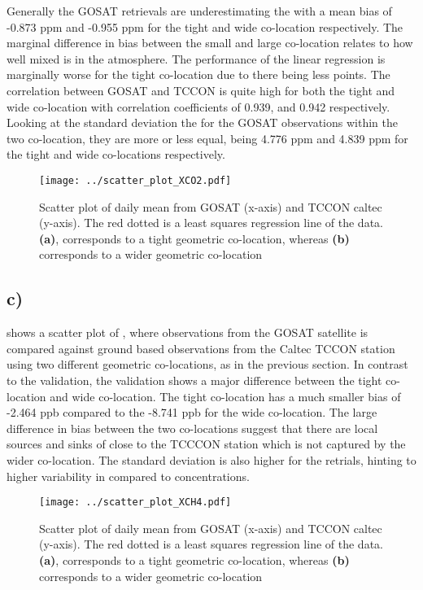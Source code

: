 Generally the GOSAT retrievals
are underestimating the  with a mean bias of -0.873 ppm and -0.955 ppm for the
tight and wide co-location respectively. The marginal difference in bias between
the small and large co-location relates to how well mixed  is in the
atmosphere. The performance of the linear
regression is marginally worse for the tight co-location due to there being less
points. The correlation between GOSAT and TCCON is quite high for both the tight
and wide co-location with correlation coefficients of 0.939, and 0.942
respectively. Looking at the
standard deviation the for the GOSAT observations within the two  co-location, they
are more or less equal, being 4.776 ppm and 4.839 ppm for the tight and wide
co-locations respectively. 
\begin{figure}[htbp]
    \centering
    \texttt{[image: ../scatter\_plot\_XCO2.pdf]}
    \caption{Scatter plot of daily mean  from GOSAT (x-axis) and TCCON caltec (y-axis). The red dotted is a least squares regression line of the data. \textbf{(a)}, corresponds to a tight geometric co-location, whereas \textbf{(b)} corresponds to a wider geometric co-location}
    \label{fig:scatter_XCO2}
\end{figure}

\subsection*{c)} 
 shows a scatter plot of , where observations
from the GOSAT satellite is compared against ground based observations from
the Caltec TCCON station using two different geometric co-locations, as in the
previous section. In contrast to the  validation, the 
validation shows a major difference between the tight co-location and wide
co-location. The tight 
co-location has a much smaller bias of -2.464 ppb compared to the -8.741 ppb for
the wide co-location. The large difference in bias between the two co-locations
suggest that there are local sources and sinks of  close to the TCCCON
station which is not captured by the wider co-location. The standard deviation
is also higher for the  retrials, hinting to higher variability in
 compared to  concentrations. 
\begin{figure}
    \centering
    \texttt{[image: ../scatter\_plot\_XCH4.pdf]}
    \caption{Scatter plot of daily mean  from GOSAT (x-axis) and TCCON caltec (y-axis). The red dotted is a least squares regression line of the data. \textbf{(a)}, corresponds to a tight geometric co-location, whereas \textbf{(b)} corresponds to a wider geometric co-location}
    \label{fig:scatter_XCH4}
\end{figure}

